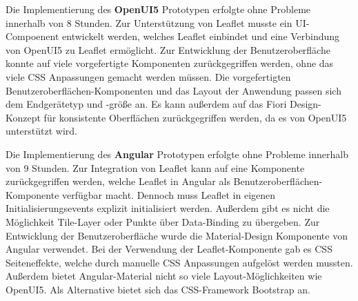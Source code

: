 Die Implementierung des \textbf{OpenUI5} Prototypen erfolgte ohne Probleme innerhalb von 8 Stunden.
Zur Unterstützung von Leaflet musste ein UI-Compoenent entwickelt werden, welches Leaflet einbindet und eine Verbindung von OpenUI5 zu Leaflet ermöglicht.
Zur Entwicklung der Benutzeroberfläche konnte auf viele vorgefertigte Komponenten zurückgegriffen werden, ohne das viele \ac{CSS} Anpassungen gemacht werden müssen.
Die vorgefertigten Benutzeroberflächen-Komponenten und das Layout der Anwendung passen sich dem Endgerätetyp und -größe an.
Es kann außerdem auf das Fiori Design-Konzept für konsistente Oberflächen zurückgegriffen werden, da es von OpenUI5 unterstützt wird.

Die Implementierung des \textbf{Angular} Prototypen erfolgte ohne Probleme innerhalb von 9 Stunden.
Zur Integration von Leaflet kann auf eine Komponente zurückgegriffen werden, welche Leaflet in Angular als Benutzeroberflächen-Komponente verfügbar macht.
Dennoch muss Leaflet in eigenen Initialisierungsevents explizit initialisiert werden.
Außerdem gibt es nicht die Möglichkeit Tile-Layer oder Punkte über Data-Binding zu übergeben.
Zur Entwicklung der Benutzeroberfläche wurde die Material-Design Komponente von Angular verwendet.
Bei der Verwendung der Leaflet-Komponente gab es \ac{CSS} Seiteneffekte, welche durch manuelle \ac{CSS} Anpassungen aufgelöst werden mussten.
Außerdem bietet Angular-Material nicht so viele Layout-Möglichkeiten wie OpenUI5.
Als Alternative bietet sich das \ac{CSS}-Framework Bootstrap an.